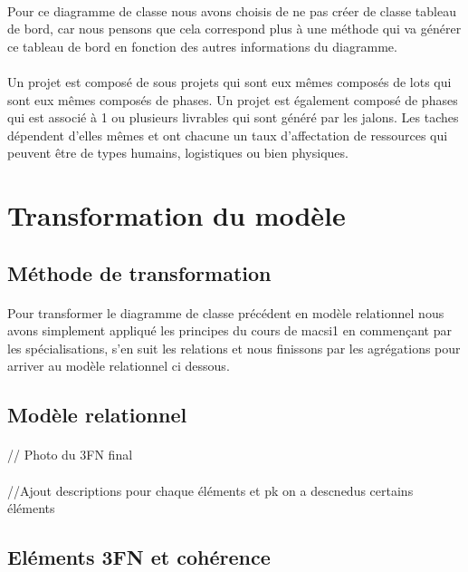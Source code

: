 \documentclass[a4paper, 12pt]{article}
\begin{document}
\paragraph{}Pour ce diagramme de classe nous avons choisis de ne pas créer de classe tableau de bord, car nous pensons que cela correspond plus à une méthode qui va générer ce tableau de bord en fonction des autres informations du diagramme.
\paragraph{}Un projet est composé de sous projets qui sont eux mêmes composés de lots qui sont eux mêmes composés de phases. Un projet est également composé de phases qui est associé à 1 ou plusieurs livrables qui sont généré par les jalons. Les taches dépendent d'elles mêmes et ont chacune un taux d'affectation de ressources qui peuvent être de types humains, logistiques ou bien physiques.

\newpage

\section{Transformation du modèle}
\subsection{Méthode de transformation}
\paragraph{}Pour transformer le diagramme de classe précédent en modèle relationnel nous avons simplement appliqué les principes du cours de macsi1 en commençant par les spécialisations, s'en suit les relations et nous finissons par les agrégations pour arriver au modèle relationnel ci dessous.
\subsection{Modèle relationnel}
\paragraph{} // Photo du 3FN final
\paragraph{} //Ajout descriptions pour chaque éléments et pk on a descnedus certains éléments
\subsection{Eléments 3FN et cohérence}
\end{document}
